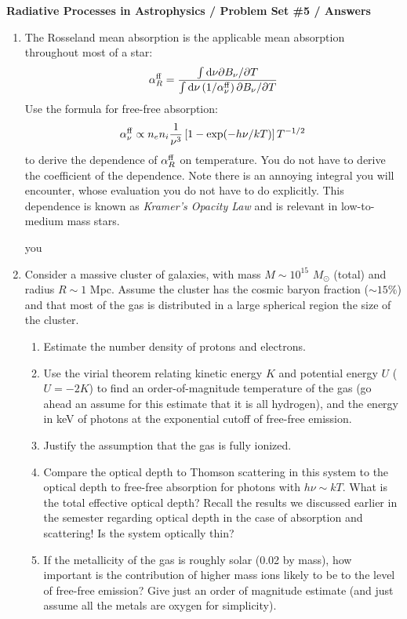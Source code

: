 \documentclass[11pt, preprint]{article}
\begin{document}
\begin{center}
  {\bf Radiative Processes in Astrophysics / Problem Set \#5 /
    Answers}
\end{center}

\begin{enumerate}
\item 
  The Rosseland mean absorption is the applicable mean absorption
  throughout most of a star:
  \begin{equation}
    \alpha_R^{\rm ff} = \frac{\int {\rm d}\nu \partial B_\nu /
      \partial T}
    {\int {\rm d}\nu \left(1/\alpha_\nu^{\rm ff}\right) \partial B_\nu / \partial T}
  \end{equation}
  Use the formula for free-free absorption:
  \begin{equation}
    \alpha_\nu^{\rm ff} \propto n_e n_i \frac{1}{\nu^3} \left[1 -
      \exp(-h\nu/ kT)\right] T^{-1/2}
  \end{equation}
  to derive the dependence of $\alpha_R^{\rm ff}$ on temperature. You
  do not have to derive the coefficient of the dependence. Note there
  is an annoying integral you will encounter, whose evaluation you do
  not have to do explicitly. This dependence is known as {\it Kramer's
    Opacity Law} and is relevant in low-to-medium mass stars.

  \begin{answer}
    you 
  \end{answer}

\item Consider a massive cluster of galaxies, with mass $M\sim
  10^{15}$ $M_\odot$ (total) and radius $R\sim 1$ Mpc. Assume
  the cluster has the cosmic baryon fraction ($\sim 15\%$) and that
  most of the gas is distributed in a large spherical region the size
  of the cluster.
\begin{enumerate}
  \item Estimate the number density of protons and electrons. 
  \item Use the virial theorem relating kinetic energy $K$ and
    potential energy $U$ ($U = -2K$) to find an order-of-magnitude
    temperature of the gas (go ahead an assume for this estimate that
    it is all hydrogen), and the energy in keV of photons at the
    exponential cutoff of free-free emission.
  \item Justify the assumption that the gas is fully ionized.
  \item Compare the optical depth to Thomson scattering in this system
    to the optical depth to free-free absorption for photons with
    $h\nu \sim kT$. What is the total effective optical depth? Recall
    the results we discussed earlier in the semester regarding optical
    depth in the case of absorption and scattering! Is the system
    optically thin?
  \item If the metallicity of the gas is roughly solar (0.02 by mass),
    how important is the contribution of higher mass ions likely to be
    to the level of free-free emission? Give just an order of
    magnitude estimate (and just assume all the metals are oxygen for
    simplicity).
\end{enumerate}

\end{enumerate}
\end{document}
